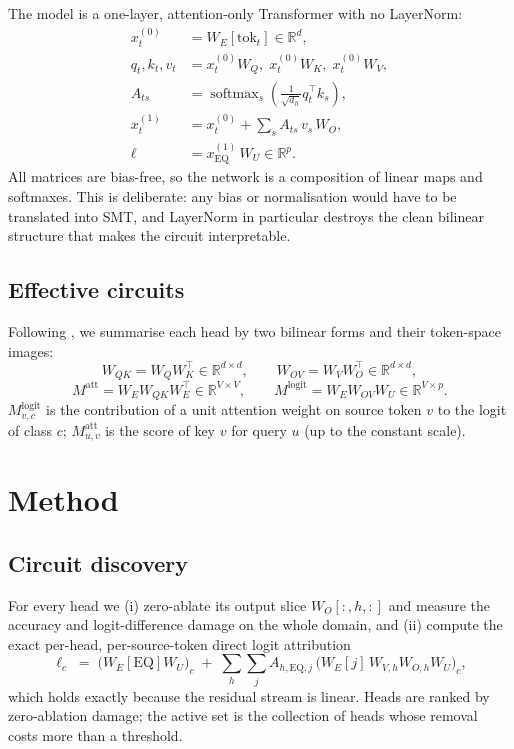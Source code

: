 \documentclass[11pt]{article}
\newcommand{\R}{\mathbb{R}}
\newcommand{\WQK}{W_{QK}}
\newcommand{\WOV}{W_{OV}}
\begin{document}
The model is a one-layer, attention-only Transformer with no LayerNorm:
\begin{align}
  x^{(0)}_t &= W_E[\text{tok}_t] \in \R^{d}, \\
  q_t, k_t, v_t &= x^{(0)}_t W_Q,\; x^{(0)}_t W_K,\; x^{(0)}_t W_V, \\
  A_{ts} &= \operatorname{softmax}_s\!\left(\tfrac{1}{\sqrt{d_h}} q_t^\top k_s\right), \\
  x^{(1)}_t &= x^{(0)}_t + \sum_{s} A_{ts}\, v_s\, W_O, \\
  \ell &= x^{(1)}_{\mathrm{EQ}}\, W_U \in \R^{p}.
\end{align}
All matrices are bias-free, so the network is a composition of linear maps and
softmaxes. This is deliberate: any bias or normalisation would have to be
translated into SMT, and LayerNorm in particular destroys the clean bilinear
structure that makes the circuit interpretable.

\subsection{Effective circuits}

Following \citet{elhage2021framework}, we summarise each head by two bilinear
forms and their token-space images:
\begin{equation}
  \WQK = W_Q W_K^\top \in \R^{d\times d}, \qquad
  \WOV = W_V W_O^\top \in \R^{d\times d},
\end{equation}
\begin{equation}
  M^{\text{att}} = W_E \WQK W_E^\top \in \R^{V\times V}, \qquad
  M^{\text{logit}} = W_E \WOV W_U \in \R^{V\times p}.
\end{equation}
$M^{\text{logit}}_{v,c}$ is the contribution of a unit attention weight on source
token $v$ to the logit of class $c$; $M^{\text{att}}_{u,v}$ is the score of key
$v$ for query $u$ (up to the constant scale).

\section{Method}
\label{sec:method}

\subsection{Circuit discovery}

For every head we (i) zero-ablate its output slice $W_O[:,h,:]$ and measure the
accuracy and logit-difference damage on the whole domain, and (ii) compute the
exact per-head, per-source-token direct logit attribution
\begin{equation}
  \ell_c \;=\; \bigl(W_E[\mathrm{EQ}]W_U\bigr)_c
  \;+\; \sum_{h}\sum_{j} A_{h,\mathrm{EQ},j}\,
        \bigl(W_E[j]\,W_{V,h}W_{O,h}W_U\bigr)_c ,
  \label{eq:dla}
\end{equation}
which holds exactly because the residual stream is linear. Heads are ranked by
zero-ablation damage; the active set is the collection of heads whose removal
costs more than a threshold.
\end{document}
